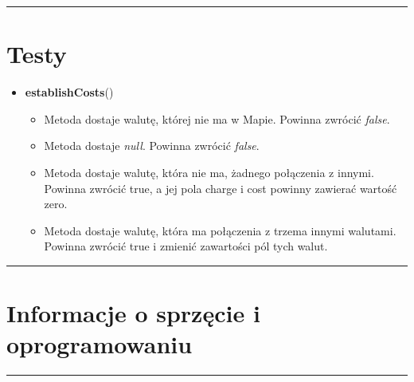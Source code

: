 \documentclass[a4paper,11pt]{article}
\newcommand{\linia}{\rule{\linewidth}{0.4mm}}
\begin{document}
\noindent\linia

\section{Testy}
\begin{itemize}
\item \textbf{establishCosts}()
\begin{itemize}
\item Metoda dostaje walutę, której nie ma w Mapie. Powinna zwrócić \textit{false}.
\item Metoda dostaje \textit{null}. Powinna zwrócić \textit{false}.
\item Metoda dostaje walutę, która nie ma, żadnego połączenia z innymi. Powinna zwrócić true, a jej pola charge i cost powinny zawierać wartość zero.
\item Metoda dostaje walutę, która ma połączenia z trzema innymi walutami. Powinna zwrócić true i zmienić zawartości pól tych walut.
\end{itemize}
\end{itemize}

\noindent\linia
\section{Informacje o sprzęcie i oprogramowaniu}

\noindent\linia
\end{document}
